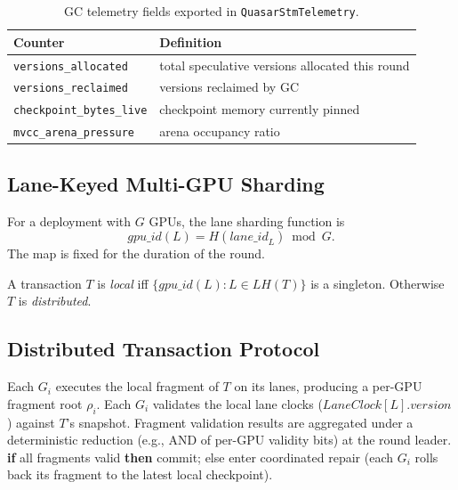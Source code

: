 \begin{table}[ht]
\centering
\begin{tabular}{@{}ll@{}}
\toprule
\textbf{Counter} & \textbf{Definition} \\
\midrule
\texttt{versions\_allocated}    & total speculative versions allocated this round \\
\texttt{versions\_reclaimed}    & versions reclaimed by GC \\
\texttt{checkpoint\_bytes\_live}& checkpoint memory currently pinned \\
\texttt{mvcc\_arena\_pressure}  & arena occupancy ratio \\
\bottomrule
\end{tabular}
\caption{GC telemetry fields exported in
\texttt{QuasarStmTelemetry}.}
\label{tab:gc-telemetry}
\end{table}

\subsection{Lane-Keyed Multi-GPU Sharding}

\begin{definition}
\label{def:lane-shard}
For a deployment with $G$ GPUs, the lane sharding function is
\[
\mathit{gpu\_id}(L) = H(\mathit{lane\_id}_L) \bmod G.
\]
The map is fixed for the duration of the round.
\end{definition}

\begin{definition}
\label{def:local-distributed}
A transaction $T$ is \emph{local} iff
$\{\mathit{gpu\_id}(L) : L \in \mathit{LH}(T)\}$ is a singleton.
Otherwise $T$ is \emph{distributed}.
\end{definition}

\subsection{Distributed Transaction Protocol}

\begin{algorithm}[H]
\caption{Distributed transaction $T$ touching GPUs $G_1,\ldots,G_k$}
\label{alg:distributed-tx}
\begin{algorithmic}[1]
\State Each $G_i$ executes the local fragment of $T$ on its lanes,
       producing a per-GPU fragment root $\rho_i$.
\State Each $G_i$ validates the local lane clocks
       ($\mathit{LaneClock}[L].\mathit{version}$) against $T$'s
       snapshot.
\State Fragment validation results are aggregated under a
       deterministic reduction (e.g., AND of per-GPU validity bits)
       at the round leader.
\State \textbf{if} all fragments valid \textbf{then} commit; else
       enter coordinated repair (each $G_i$ rolls back its fragment
       to the latest local checkpoint).
\end{algorithmic}
\end{algorithm}

